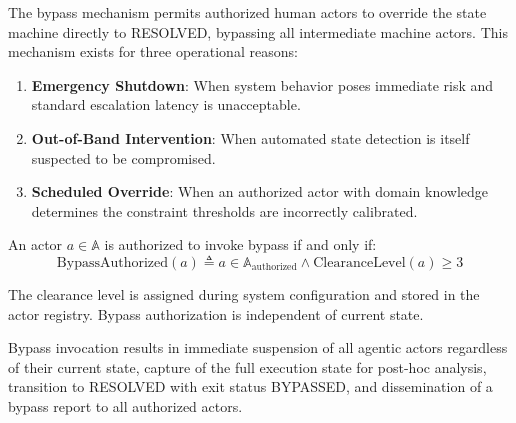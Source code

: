 The bypass mechanism permits authorized human actors to override the state machine directly to RESOLVED, bypassing all intermediate machine actors. This mechanism exists for three operational reasons:

\begin{enumerate}
\item \textbf{Emergency Shutdown}: When system behavior poses immediate risk and standard escalation latency is unacceptable.
\item \textbf{Out-of-Band Intervention}: When automated state detection is itself suspected to be compromised.
\item \textbf{Scheduled Override}: When an authorized actor with domain knowledge determines the constraint thresholds are incorrectly calibrated.
\end{enumerate}

\begin{definition}
An actor $a \in \mathbb{A}$ is authorized to invoke bypass if and only if:
\[
\text{BypassAuthorized}(a) \triangleq a \in \mathbb{A}_{\text{authorized}} \land \text{ClearanceLevel}(a) \geq 3
\]

The clearance level is assigned during system configuration and stored in the actor registry. Bypass authorization is independent of current state.
\end{definition}

\begin{algorithm}[htbp]
\caption{Bypass Invocation Algorithm}
\label{alg:bypass}
\end{algorithm}

Bypass invocation results in immediate suspension of all agentic actors regardless of their current state, capture of the full execution state for post-hoc analysis, transition to RESOLVED with exit status BYPASSED, and dissemination of a bypass report to all authorized actors.

